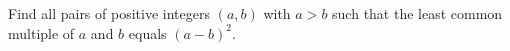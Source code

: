 Find all pairs of positive integers \((a,b)\) with \(a>b\) such that the least common multiple of \(a\) and \(b\) equals \((a-b)^2\).
